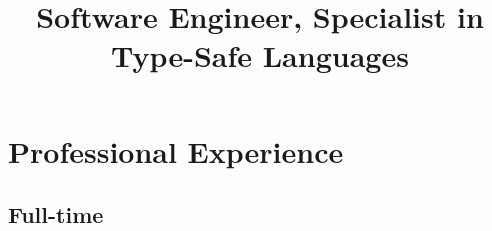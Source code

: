 \documentclass[11pt,a4paper,roman]{moderncv}
\title{Software Engineer, Specialist in Type-Safe Languages}
\begin{document}
\makecvtitle



\newcommand\seeabovedesc{(\textit{See description above.})}

\newcommand\daterange[2]{#1\,--\,#2}

\newcommand\altamont{Altamont, Tennessee, USA}
\newcommand\austin{Austin, Texas, USA}
\newcommand\centurion{Centurion, South Africa}
\newcommand\chattanooga{Chattanooga, Tennessee, USA}
\newcommand\chippewafalls{Chippewa Falls, Wisconsin, USA}
\newcommand\london{London, UK}
\newcommand\portland{Portland, Oregon, USA}
\newcommand\pretoria{Pretoria, South Africa}
\newcommand\sanfrancisco{San Francisco, California, USA}
\newcommand\stlouis{St. Louis, Missouri, USA}
\newcommand\utrecht{Utrecht, The Netherlands}
\newcommand\whitemarsh{White Marsh, Maryland, USA}

\newcommand\uu{Utrecht University}
\newcommand\wustl{Washington University in St. Louis}
\newcommand\wustlshort{Washington University}
\newcommand\ut{University of Texas at Austin}



\newcommand\Cpp{C{}\texttt{++}\xspace}


\section{Professional Experience}


\subsection{Full-time}
\end{document}
